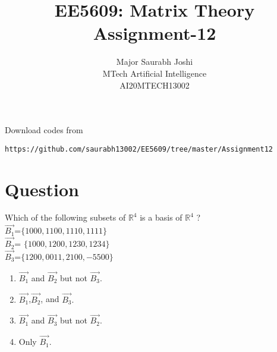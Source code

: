 \documentclass[journal,12pt,onecolumn]{IEEEtran}
\begin{document}
     \def\rightbox#1{\makebox[0in][r]{#1}}
     \def\centbox#1{\makebox[0in]{#1}}
     \def\topbox#1{\raisebox{-\baselineskip}[0in][0in]{#1}}
     \def\midbox#1{\raisebox{-0.5\baselineskip}[0in][0in]{#1}}
\vspace{3cm}
\onecolumn
\title{EE5609: Matrix Theory\\
          Assignment-12\\}
\author{Major Saurabh Joshi\\MTech Artificial Intelligence\\AI20MTECH13002 }
\maketitle
\bigskip
\renewcommand{\thefigure}{\theenumi}
\renewcommand{\thetable}{\theenumi}
Download codes from 
%
\begin{lstlisting}
https://github.com/saurabh13002/EE5609/tree/master/Assignment12
\end{lstlisting}
%
 
\section{Question}
Which of the following subsets of $\mathbb{R}^4$ is a basis of $\mathbb{R}^4$ ?\\
$\vec{B_1}$=$\{1000,1100,1110,1111\}$\\$\vec{B_2}$= $\{1000,1200,1230,1234\}$\\$\vec{B_3}$=$\{1200,0011,2100,-5500\}$
\begin{enumerate}
\item $\vec{B_1}$ and $\vec{B_2}$ but not $\vec{B_3}.$ 
\item $\vec{B_1}$,$\vec{B_2}$, and $\vec{B_3}.$
\item $\vec{B_1}$ and $\vec{B_3}$ but not $\vec{B_2}.$
\item Only $\vec{B_1}.$ 
\end{enumerate}
%
\end{document}
